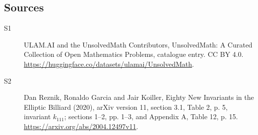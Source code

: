 \documentclass[11pt]{article}
\begin{document}
\subsection{Sources}
\begin{description}
\item[\hypertarget{source:statement:1}{S1}] ULAM.AI and the UnsolvedMath Contributors, UnsolvedMath: A Curated Collection of Open Mathematics Problems, catalogue entry. CC BY 4.0. \url{https://huggingface.co/datasets/ulamai/UnsolvedMath}.
\item[\hypertarget{source:statement:2}{S2}] Dan Reznik, Ronaldo Garcia and Jair Koiller, Eighty New Invariants in the Elliptic Billiard (2020), arXiv version 11, section 3.1, Table 2, p. 5, invariant $k_{111}$; sections 1--2, pp. 1--3, and Appendix A, Table 12, p. 15. \url{https://arxiv.org/abs/2004.12497v11}.
\end{description}
\label{end:statement}
\end{document}
